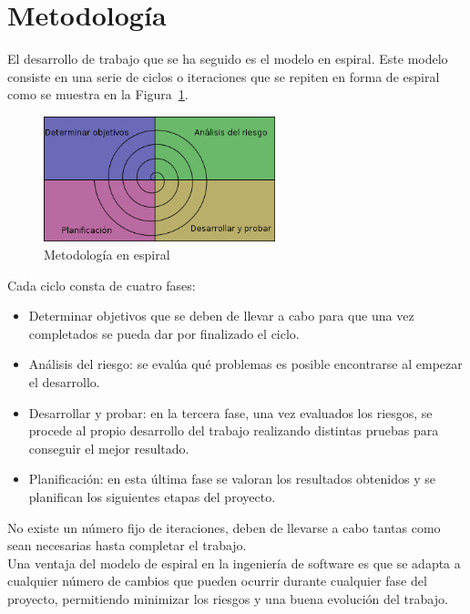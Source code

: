 \section{Metodología}

El desarrollo de trabajo que se ha seguido es el modelo en espiral. Este modelo consiste en una serie de ciclos o iteraciones que se repiten en forma de espiral como se muestra en la Figura~\ref{fig.espiral}.

\begin{figure}[H]
  \begin{center}
    \includegraphics[width=0.6\textwidth]{figures/Objetivos/espiral.png}
		\caption{Metodología en espiral}
		\label{fig.espiral}
		\end{center}
\end{figure}

Cada ciclo consta de cuatro fases:
\begin{itemize}
	\item Determinar objetivos que se deben de llevar a cabo para que una vez completados se pueda dar por finalizado el ciclo.

	\item Análisis del riesgo: se evalúa qué problemas es posible encontrarse al empezar el desarrollo.

	\item Desarrollar y probar: en la tercera fase, una vez evaluados los riesgos, se procede al propio desarrollo del trabajo realizando distintas pruebas para conseguir el mejor resultado.

	\item Planificación: en esta última fase se valoran los resultados obtenidos y se planifican los siguientes etapas del proyecto.
\end{itemize}

No existe un número fijo de iteraciones, deben de llevarse a cabo tantas como sean necesarias hasta completar el trabajo. \\

Una ventaja del modelo de espiral en la ingeniería de software es que se adapta a cualquier número de cambios que pueden ocurrir durante cualquier fase del proyecto, permitiendo minimizar los riesgos y una buena evolución del trabajo. \\

